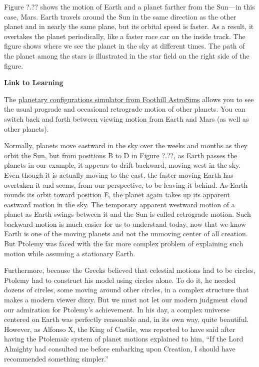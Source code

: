 \documentclass[main.tex]{subfiles}
\begin{document}
\vspace{1em}

Figure ?.?? shows the motion of Earth and a planet farther from the Sun---in this case, Mars. Earth travels around the Sun in the same direction as the other planet and in nearly the same plane, but its orbital speed is faster. As a result, it overtakes the planet periodically, like a faster race car on the inside track. The figure shows where we see the planet in the sky at different times. The path of the planet among the stars is illustrated in the star field on the right side of the figure.


\vspace{1em}

\begin{mdframed}[backgroundcolor=black!10]
    \textbf{Link to Learning}

    \vspace{1ex}

    The \href{https://openstax.org/l/30planetconfig}{planetary configurations simulator from Foothill AstroSims} allows you to see the usual prograde and occasional retrograde motion of other planets. You can switch back and forth between viewing motion from Earth and Mars (as well as other planets).
\end{mdframed}

\vspace{1em}

Normally, planets move eastward in the sky over the weeks and months as they orbit the Sun, but from positions B to D in Figure ?.??, as Earth passes the planets in our example, it appears to drift backward, moving west in the sky. Even though it is actually moving to the east, the faster-moving Earth has overtaken it and seems, from our perspective, to be leaving it behind. As Earth rounds its orbit toward position E, the planet again takes up its apparent eastward motion in the sky. The temporary apparent westward motion of a planet as Earth swings between it and the Sun is called \gls{retrograde motion}. Such backward motion is much easier for us to understand today, now that we know Earth is one of the moving planets and not the unmoving center of all creation. But Ptolemy was faced with the far more complex problem of explaining such motion while assuming a stationary Earth.

\vspace{1em}

Furthermore, because the Greeks believed that celestial motions had to be circles, Ptolemy had to construct his model using circles alone. To do it, he needed dozens of circles, some moving around other circles, in a complex structure that makes a modern viewer dizzy. But we must not let our modern judgment cloud our admiration for Ptolemy's achievement. In his day, a complex universe centered on Earth was perfectly reasonable and, in its own way, quite beautiful. However, as Alfonso X, the King of Castile, was reported to have said after having the Ptolemaic system of planet motions explained to him, ``If the Lord Almighty had consulted me before embarking upon Creation, I should have recommended something simpler.''
\end{document}
